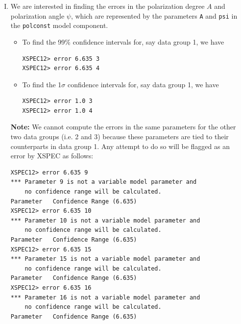 \begin{itemize}
\begin{enumerate}[I.]
\begin{verbatim}
Fit statistic: Chi-Squared 131.57 using 149 bins,
								  spectrum 1, group 1.
Chi-Squared      159.05     using 149 bins, spectrum 2, group 1.
Chi-Squared      122.69     using 149 bins, spectrum 3, group 1.
Chi-Squared      130.71     using 149 bins, spectrum 4, group 2.
Chi-Squared      118.58     using 149 bins, spectrum 5, group 2.
Chi-Squared      157.11     using 149 bins, spectrum 6, group 2.
Chi-Squared       60.87     using 149 bins, spectrum 7, group 3.
Chi-Squared       82.38     using 149 bins, spectrum 8, group 3.
Chi-Squared       69.58     using 149 bins, spectrum 9, group 3.
Total fit statistic                 1032.53     with 1334 d.o.f.

Test statistic : Chi-Squared        1032.53     using 1341 bins.
Null hypothesis probability of 1.00e+00 with 1334 degrees of freedom
        	\end{verbatim}
        	
        	\item We are interested in finding the errors in the polarization degree $A$ and polarization angle $\psi$, which are represented by the parameters \verb|A| and \verb|psi| in the \verb|polconst| model component.
        	\begin{itemize}
        		\item To find the 99\% confidence intervals for, say data group 1, we have
        		\begin{verbatim}
XSPEC12> error 6.635 3
XSPEC12> error 6.635 4
        		\end{verbatim}
        		
        		\item To find the 1$\sigma$ confidence intervals for, say data group 1, we have
        		\begin{verbatim}
XSPEC12> error 1.0 3
XSPEC12> error 1.0 4
        		\end{verbatim}
        	\end{itemize}
        	\textbf{Note:} We cannot compute the errors in the same parameters for the other two data groups (i.e. 2 and 3) because these parameters are tied to their counterparts in data group 1. Any attempt to do so will be flagged as an error by XSPEC as follows:
        	\begin{verbatim}
XSPEC12> error 6.635 9
*** Parameter 9 is not a variable model parameter and
	no confidence range will be calculated.
Parameter   Confidence Range (6.635)
XSPEC12> error 6.635 10
*** Parameter 10 is not a variable model parameter and
	no confidence range will be calculated.
Parameter   Confidence Range (6.635)
XSPEC12> error 6.635 15
*** Parameter 15 is not a variable model parameter and
	no confidence range will be calculated.
Parameter   Confidence Range (6.635)
XSPEC12> error 6.635 16
*** Parameter 16 is not a variable model parameter and
	no confidence range will be calculated.
Parameter   Confidence Range (6.635)
        	\end{verbatim}
        	

\end{enumerate}
\end{itemize}
